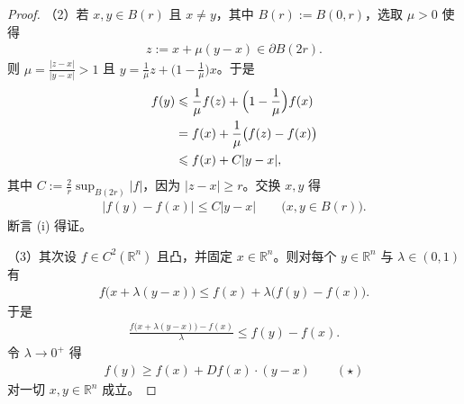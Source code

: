 \documentclass[../../main.tex]{subfiles}%
\begin{document}
\begin{proof}
（2）若 $x,y\in B(r)$ 且 $x\neq y$，其中 $B(r):=B(0,r)$，选取 $\mu>0$ 使得
\begin{align*}
z:=x+\mu(y-x)\in\partial B(2r).
\end{align*}
则 $\mu=\frac{\lvert z-x\rvert}{\lvert y-x\rvert}>1$ 且 $y=\frac1\mu z+\bigl(1-\frac1\mu\bigr)x$。于是
\begin{align*}
f(y)&\leqslant\frac1\mu f(z)+\Bigl(1-\frac1\mu\Bigr)f(x)\\
&=f(x)+\frac1\mu\bigl(f(z)-f(x)\bigr)\\
&\leqslant f(x)+C\lvert y-x\rvert,
\end{align*}
其中 $C:=\frac2r\sup_{B(2r)}\lvert f\rvert$，因为 $\lvert z-x\rvert\geqslant r$。交换 $x,y$ 得
\begin{align*}
\lvert f(y)-f(x)\rvert\leqslant C\lvert y-x\rvert\qquad\bigl(x,y\in B(r)\bigr).
\end{align*}
断言 (i) 得证。

（3）其次设 $f\in C^{2}(\mathbb{R}^n)$ 且凸，并固定 $x\in\mathbb{R}^n$。则对每个 $y\in\mathbb{R}^n$ 与 $\lambda\in(0,1)$ 有
\begin{align*}
f\bigl(x+\lambda(y-x)\bigr)\leqslant f(x)+\lambda\bigl(f(y)-f(x)\bigr).
\end{align*}
于是
\begin{align*}
\frac{f\bigl(x+\lambda(y-x)\bigr)-f(x)}{\lambda}\leqslant f(y)-f(x).
\end{align*}
令 $\lambda\to0^{+}$ 得
\begin{align*}
f(y)\geqslant f(x)+Df(x)\cdot(y-x)\qquad(\star)
\end{align*}
对一切 $x,y\in\mathbb{R}^n$ 成立。


\end{proof}
\end{document}

